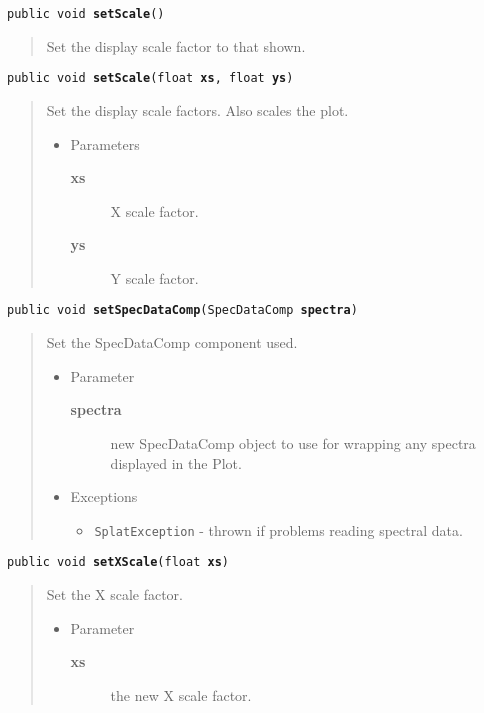 \documentclass[twoside,11pt,nolof]{starlink}
\providecommand{\method}[1]{\texttt{#1}}
\newenvironment{desc}{\begin{quote}}{\end{quote}}
\begin{document}
\method{public void \textbf{setScale}()\label{l204}\label{l205}}
\begin{desc}Set the display scale factor to that shown.
\end{desc}

\method{public void \textbf{setScale}(\texttt{float} \textbf{xs}, \texttt{float} \textbf{ys})\label{l206}\label{l207}}
\begin{desc}Set the display scale factors. Also scales the plot.
\begin{itemize}
\item{Parameters
  \begin{description}
   \item[\textbf{xs}]{X scale factor.}
   \item[\textbf{ys}]{Y scale factor.}
  \end{description}}
\end{itemize}
\end{desc}

\method{public void \textbf{setSpecDataComp}(\texttt{SpecDataComp} \textbf{spectra})\label{l208}\label{l209}}
\begin{desc}Set the SpecDataComp component used.
\begin{itemize}
\item{Parameter
  \begin{description}
   \item[\textbf{spectra}]{new SpecDataComp object to use for wrapping any
                spectra displayed in the Plot.}
  \end{description}}
\end{itemize}
\begin{itemize}
\item{{Exceptions}
  \begin{itemize}
   \item{\vspace{-.6ex}\texttt{SplatException} - thrown if problems reading spectral
            data.}
  \end{itemize}
}
\end{itemize}
\end{desc}

\method{public void \textbf{setXScale}(\texttt{float} \textbf{xs})\label{l210}\label{l211}}
\begin{desc}Set the X scale factor.
\begin{itemize}
\item{Parameter
  \begin{description}
   \item[\textbf{xs}]{the new X scale factor.}
  \end{description}}
\end{itemize}
\end{desc}
\end{document}
